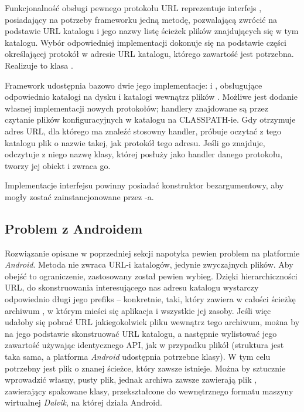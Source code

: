 Funkcjonalność obsługi pewnego protokołu URL reprezentuje interfejs ,
posiadający na potrzeby frameworku jedną metodę, pozwalającą zwrócić na podstawie URL katalogu i
jego nazwy listę ścieżek plików znajdujących się w tym katalogu. Wybór odpowiedniej implementacji
dokonuje się na podstawie części określającej protokół w adresie URL katalogu, którego zawartość
jest potrzebna. Realizuje to klasa .

Framework udostępnia bazowo dwie jego implementacje:  i
, obsługujące odpowiednio katalogi na dysku i katalogi wewnątrz plików
. Możliwe jest dodanie własnej implementacji nowych protokołów; handlery znajdowane są
przez czytanie plików konfiguracyjnych w katalogu
 na CLASSPATH-ie. Gdy
 otrzymuje adres URL, dla którego ma znaleźć stosowny handler, próbuje
oczytać z tego katalogu plik o nazwie takej, jak protokół tego adresu. Jeśli go znajduje, odczytuje
z niego nazwę klasy, której posłuży jako handler danego protokołu, tworzy jej obiekt i zwraca go.

\begin{Important}
  Implementacje interfejsu  powinny posiadać konstruktor bezargumentowy,
  aby mogły zostać zainstancjonowane przez -a.
\end{Important}


\subsection{Problem z Androidem}

Rozwiązanie opisane w poprzedniej sekcji napotyka pewien problem na platformie \emph{Android}.
Metoda  nie zwraca URL-i katalogów, jedynie zwyczajnych plików. Aby
obejść to ograniczenie, zastosowany został pewien wybieg. Dzięki hierarchiczności URL, do
skonstruowania interesującego nas adresu katalogu wystarczy odpowiednio długi jego prefiks --
konkretnie, taki, który zawiera w całości ścieżkę archiwum , w którym mieści się
aplikacja i wszystkie jej zasoby. Jeśli więc udałoby się pobrać URL jakiegokolwiek pliku wewnątrz
tego archiwum, można by na jego podstawie skonstruować URL katalogu, a następnie wylistować jego
zawartość używając identycznego API, jak w przypadku plikół  (struktura jest taka sama, a
platforma \emph{Android} udostępnia potrzebne klasy). W tym celu potrzebny jest plik o znanej
ścieżce, który zawsze istnieje. Można by sztucznie wprowadzić własny, pusty plik, jednak archiwa
 zawsze zawierają plik , zawierający spakowane klasy, przekształcone do
wewnętrznego formatu maszyny wirtualnej \emph{Dalvik}, na której działa Android.

